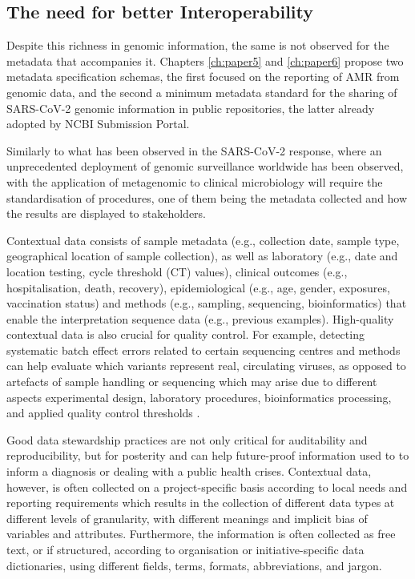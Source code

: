\subsection{The need for better Interoperability}

Despite this richness in genomic information, the same is not observed for the metadata that accompanies it. Chapters \ref{ch:paper5} and \ref{ch:paper6} propose two metadata specification schemas, the first focused on the reporting of \ac{AMR} from genomic data, and the second a minimum metadata standard for the sharing of \ac{SARS-CoV-2} genomic information in public repositories, the latter already adopted by NCBI Submission Portal. 

Similarly to what has been observed in the \ac{SARS-CoV-2} response, where an unprecedented deployment of genomic surveillance worldwide has been observed, with the application of metagenomic to clinical microbiology will require the standardisation of procedures, one of them being the metadata collected and how the results are displayed to stakeholders. 

Contextual data consists of sample metadata (e.g., collection date, sample type, geographical location of sample collection), as well as laboratory (e.g., date and location testing, cycle threshold (CT) values), clinical outcomes (e.g., hospitalisation, death, recovery), epidemiological (e.g., age, gender, exposures, vaccination status) and methods (e.g., sampling, sequencing, bioinformatics) that enable the interpretation sequence data (e.g., previous examples). High-quality contextual data is also crucial for quality control. For example, detecting systematic batch effect errors related to certain sequencing centres and methods can help evaluate which variants represent real, circulating viruses, as opposed to artefacts of sample handling or sequencing which may arise due to different aspects experimental design, laboratory procedures, bioinformatics processing, and applied quality control thresholds \cite{de_maio_issues_2020, rayko_quality_2020, poon_recurrent_2005}. 

Good data stewardship practices are not only critical for auditability and reproducibility, but for posterity and can help future-proof information used to to inform a diagnosis or dealing with a public health crises. Contextual data, however, is often collected on a project-specific basis according to local needs and reporting requirements which results in the collection of different data types at different levels of granularity, with different meanings and implicit bias of variables and attributes. Furthermore, the information is often collected as free text, or if structured, according to organisation or initiative-specific data dictionaries, using different fields, terms, formats, abbreviations, and jargon.

